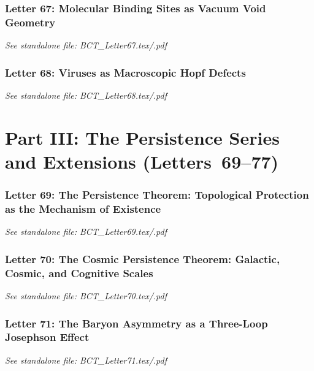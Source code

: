 \documentclass[aps,preprint,superscriptaddress,floatfix]{revtex4-2}
\begin{document}
\newpage
\section*{Letter 67: Molecular Binding Sites as Vacuum Void Geometry}
\textit{See standalone file: BCT\_Letter67.tex/.pdf}

\newpage
\section*{Letter 68: Viruses as Macroscopic Hopf Defects}
\textit{See standalone file: BCT\_Letter68.tex/.pdf}

\newpage
\part*{Part III: The Persistence Series and Extensions (Letters~69--77)}

\newpage
\section*{Letter 69: The Persistence Theorem: Topological Protection as the Mechanism of Existence}
\textit{See standalone file: BCT\_Letter69.tex/.pdf}

\newpage
\section*{Letter 70: The Cosmic Persistence Theorem: Galactic, Cosmic, and Cognitive Scales}
\textit{See standalone file: BCT\_Letter70.tex/.pdf}

\newpage
\section*{Letter 71: The Baryon Asymmetry as a Three-Loop Josephson Effect}
\textit{See standalone file: BCT\_Letter71.tex/.pdf}

\newpage
\end{document}
